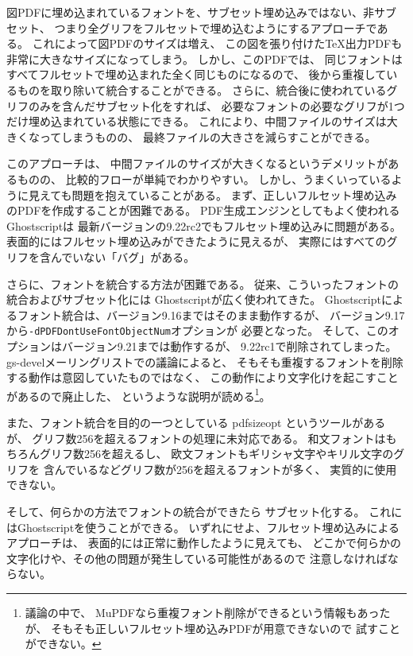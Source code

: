 \documentclass[twocolumn,jafontscale=0.962216,jlreq_notes]{jlreq}
\begin{document}
図PDFに埋め込まれているフォントを、サブセット埋め込みではない、非サブセット、
つまり全グリフをフルセットで埋め込むようにするアプローチである。
これによって図PDFのサイズは増え、
この図を張り付けた\TeX 出力PDFも非常に大きなサイズになってしまう。
しかし、このPDFでは、
同じフォントはすべてフルセットで埋め込まれた全く同じものになるので、
後から重複しているものを取り除いて統合することができる。
さらに、統合後に使われているグリフのみを含んだサブセット化をすれば、
必要なフォントの必要なグリフが1つだけ埋め込まれている状態にできる。
これにより、中間ファイルのサイズは大きくなってしまうものの、
最終ファイルの大きさを減らすことができる。

このアプローチは、
中間ファイルのサイズが大きくなるというデメリットがあるものの、
比較的フローが単純でわかりやすい。
しかし、うまくいっているように見えても問題を抱えていることがある。
まず、正しいフルセット埋め込みのPDFを作成することが困難である。
PDF生成エンジンとしてもよく使われるGhostscriptは
最新バージョンの9.22rc2でもフルセット埋め込みに問題がある。
表面的にはフルセット埋め込みができたように見えるが、
実際にはすべてのグリフを含んでいない「バグ」がある\cite{gs-non-subset}。

さらに、フォントを統合する方法が困難である。
従来、こういったフォントの統合およびサブセット化には
Ghostscriptが広く使われてきた。
Ghostscriptによるフォント統合は、バージョン9.16まではそのまま動作するが、
バージョン9.17から\verb|-dPDFDontUseFontObjectNum|オプションが
必要となった。
そして、このオプションはバージョン9.21までは動作するが、
9.22rc1で削除されてしまった\cite{gs-PDFDontUseFontObjectNum}。
gs-develメーリングリストでの議論によると、
そもそも重複するフォントを削除する動作は意図していたものではなく、
この動作により文字化けを起こすことがあるので廃止した、
というような説明が読める\footnote{議論の中で、
MuPDFなら重複フォント削除ができるという情報もあったが、
そもそも正しいフルセット埋め込みPDFが用意できないので
試すことができない。}。

また、フォント統合を目的の一つとしている
pdfsizeopt \cite{pdfsizeopt}というツールがあるが、
グリフ数256を超えるフォントの処理に未対応である\cite{pdfsizeopt14}。
和文フォントはもちろんグリフ数256を超えるし、
欧文フォントもギリシャ文字やキリル文字のグリフを
含んでいるなどグリフ数が256を超えるフォントが多く、
実質的に使用できない。

そして、何らかの方法でフォントの統合ができたら
サブセット化する。
これにはGhostscriptを使うことができる。
いずれにせよ、フルセット埋め込みによるアプローチは、
表面的には正常に動作したように見えても、
どこかで何らかの文字化けや、その他の問題が発生している可能性があるので
注意しなければならない。
\end{document}
